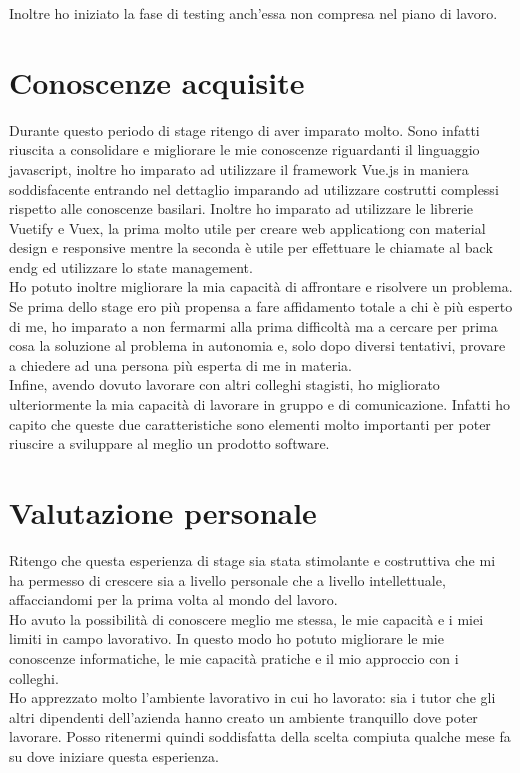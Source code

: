 Inoltre ho iniziato la fase di testing anch'essa non compresa nel piano di lavoro.

\section{Conoscenze acquisite}
\label{sec:conoscenze-acquisite}

Durante questo periodo di stage ritengo di aver imparato molto. Sono infatti riuscita a consolidare e migliorare le mie conoscenze riguardanti il linguaggio javascript, inoltre ho imparato ad utilizzare il framework Vue.js in maniera soddisfacente entrando nel dettaglio imparando ad utilizzare costrutti complessi rispetto alle conoscenze basilari. Inoltre ho imparato ad utilizzare le librerie Vuetify e Vuex, la prima molto utile per creare \gls{web applicationg} con material design e responsive mentre la seconda è utile per effettuare le chiamate al \gls{back endg} ed utilizzare lo state management.\\
Ho potuto inoltre migliorare la mia capacità di affrontare e risolvere un problema. Se prima dello stage ero più propensa a fare affidamento totale a chi è più esperto di me, ho imparato a non fermarmi alla prima difficoltà ma a cercare per prima cosa la soluzione al problema in autonomia e, solo dopo diversi tentativi, provare a chiedere ad una persona più esperta di me in materia.\\
Infine, avendo dovuto lavorare con altri colleghi stagisti, ho migliorato ulteriormente la mia capacità di lavorare in gruppo e di comunicazione. Infatti ho capito che queste due caratteristiche sono elementi molto importanti per poter riuscire a sviluppare al meglio un prodotto software.

\section{Valutazione personale}
\label{sec:valutazione-personale}

Ritengo che questa esperienza di stage sia stata stimolante e costruttiva che mi ha permesso di crescere sia a livello personale che a livello intellettuale, affacciandomi per la prima volta al mondo del lavoro.\\
Ho avuto la possibilità di conoscere meglio me stessa, le mie capacità e i miei limiti in campo lavorativo. In questo modo ho potuto migliorare le mie conoscenze informatiche, le mie capacità pratiche e il mio approccio con i colleghi.\\
Ho apprezzato molto l'ambiente lavorativo in cui ho lavorato: sia i tutor che gli altri dipendenti dell'azienda hanno creato un ambiente tranquillo dove poter lavorare. Posso ritenermi quindi soddisfatta della scelta compiuta qualche mese fa su dove iniziare questa esperienza. 
